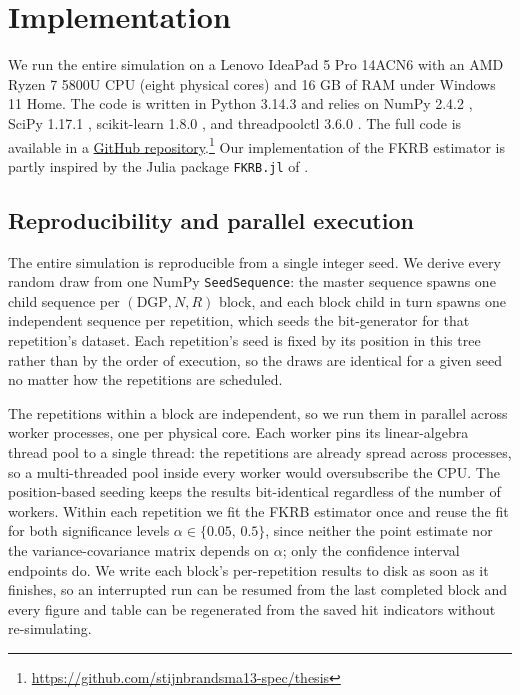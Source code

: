 \section{Implementation}
\label{sec:implementation}
We run the entire simulation on a Lenovo IdeaPad 5 Pro 14ACN6 with an AMD Ryzen 7 5800U CPU (eight physical cores) and 16 GB of RAM under Windows 11 Home.
The code is written in Python 3.14.3 and relies on NumPy 2.4.2 \citep{numpy2020}, SciPy 1.17.1 \citep{scipy2020}, scikit-learn 1.8.0 \citep{scikitlearn2011}, and threadpoolctl 3.6.0 \citep{threadpoolctl2025}.
The full code is available in a \href{https://github.com/stijnbrandsma13-spec/thesis}{GitHub repository}.\footnote{\url{https://github.com/stijnbrandsma13-spec/thesis}}
Our implementation of the FKRB estimator is partly inspired by the Julia package \texttt{FKRB.jl} of \citet{Brand2023}.

\subsection{Reproducibility and parallel execution}
\label{sec:implementation:reproducibility}
The entire simulation is reproducible from a single integer seed.
We derive every random draw from one NumPy \texttt{SeedSequence}: the master sequence spawns one child sequence per $(\text{DGP}, N, R)$ block, and each block child in turn spawns one independent sequence per repetition, which seeds the bit-generator for that repetition's dataset.
Each repetition's seed is fixed by its position in this tree rather than by the order of execution, so the draws are identical for a given seed no matter how the repetitions are scheduled.

The repetitions within a block are independent, so we run them in parallel across worker processes, one per physical core.
Each worker pins its linear-algebra thread pool to a single thread: the repetitions are already spread across processes, so a multi-threaded pool inside every worker would oversubscribe the CPU.
The position-based seeding keeps the results bit-identical regardless of the number of workers.
Within each repetition we fit the FKRB estimator once and reuse the fit for both significance levels $\alpha \in \{0.05,\,0.5\}$, since neither the point estimate nor the variance-covariance matrix depends on $\alpha$; only the confidence interval endpoints do.
We write each block's per-repetition results to disk as soon as it finishes, so an interrupted run can be resumed from the last completed block and every figure and table can be regenerated from the saved hit indicators without re-simulating.

